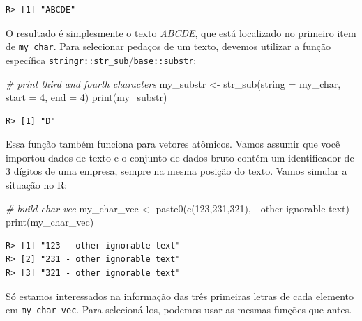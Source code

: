 \documentclass[
  11pt,
]{book}
\newenvironment{Shaded}{\begin{snugshade}}{\end{snugshade}}
\newcommand{\AttributeTok}[1]{\textcolor[rgb]{0.61,0.61,0.61}{#1}}
\newcommand{\CommentTok}[1]{\textcolor[rgb]{0.37,0.37,0.37}{\textit{#1}}}
\newcommand{\DecValTok}[1]{\textcolor[rgb]{0.06,0.06,0.06}{#1}}
\newcommand{\FunctionTok}[1]{\textcolor[rgb]{0,0,0}{#1}}
\newcommand{\NormalTok}[1]{#1}
\newcommand{\OtherTok}[1]{\textcolor[rgb]{0.37,0.37,0.37}{#1}}
\newcommand{\StringTok}[1]{\textcolor[rgb]{0.5,0.5,0.5}{#1}}
\begin{document}
\begin{verbatim}
R> [1] "ABCDE"
\end{verbatim}

O resultado é simplesmente o texto \emph{ABCDE}, que está localizado no primeiro item de \texttt{my\_char}. Para selecionar pedaços de um texto, devemos utilizar a função específica \texttt{stringr::str\_sub}/\texttt{base::substr}: 

\begin{Shaded}
\begin{Highlighting}[]
\CommentTok{\# print third and fourth characters}
\NormalTok{my\_substr }\OtherTok{\textless{}{-}} \FunctionTok{str\_sub}\NormalTok{(}\AttributeTok{string =}\NormalTok{ my\_char,}
                     \AttributeTok{start =} \DecValTok{4}\NormalTok{,}
                     \AttributeTok{end =} \DecValTok{4}\NormalTok{)}
\FunctionTok{print}\NormalTok{(my\_substr)}
\end{Highlighting}
\end{Shaded}

\begin{verbatim}
R> [1] "D"
\end{verbatim}

Essa função também funciona para vetores atômicos. Vamos assumir que você importou dados de texto e o conjunto de dados bruto contém um identificador de 3 dígitos de uma empresa, sempre na mesma posição do texto. Vamos simular a situação no R:

\begin{Shaded}
\begin{Highlighting}[]
\CommentTok{\# build char vec}
\NormalTok{my\_char\_vec }\OtherTok{\textless{}{-}} \FunctionTok{paste0}\NormalTok{(}\FunctionTok{c}\NormalTok{(}\StringTok{\textquotesingle{}123\textquotesingle{}}\NormalTok{,}\StringTok{\textquotesingle{}231\textquotesingle{}}\NormalTok{,}\StringTok{\textquotesingle{}321\textquotesingle{}}\NormalTok{),}
                      \StringTok{\textquotesingle{} {-} other ignorable text\textquotesingle{}}\NormalTok{)}
\FunctionTok{print}\NormalTok{(my\_char\_vec)}
\end{Highlighting}
\end{Shaded}

\begin{verbatim}
R> [1] "123 - other ignorable text"
R> [2] "231 - other ignorable text"
R> [3] "321 - other ignorable text"
\end{verbatim}

Só estamos interessados na informação das três primeiras letras de cada elemento em \texttt{my\_char\_vec}. Para selecioná-los, podemos usar as mesmas funções que antes.
\end{document}
